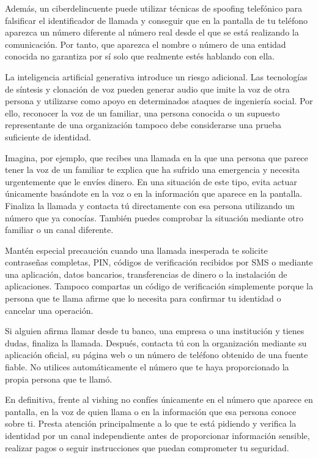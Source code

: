\documentclass[
  spanish,
  a4paper,
  openany]{book}
\begin{document}
Además, un ciberdelincuente puede utilizar técnicas de spoofing telefónico para falsificar el identificador de llamada y conseguir que en la pantalla de tu teléfono aparezca un número diferente al número real desde el que se está realizando la comunicación. Por tanto, que aparezca el nombre o número de una entidad conocida no garantiza por sí solo que realmente estés hablando con ella.

La inteligencia artificial generativa introduce un riesgo adicional. Las tecnologías de síntesis y clonación de voz pueden generar audio que imite la voz de otra persona y utilizarse como apoyo en determinados ataques de ingeniería social. Por ello, reconocer la voz de un familiar, una persona conocida o un supuesto representante de una organización tampoco debe considerarse una prueba suficiente de identidad.

Imagina, por ejemplo, que recibes una llamada en la que una persona que parece tener la voz de un familiar te explica que ha sufrido una emergencia y necesita urgentemente que le envíes dinero. En una situación de este tipo, evita actuar únicamente basándote en la voz o en la información que aparece en la pantalla. Finaliza la llamada y contacta tú directamente con esa persona utilizando un número que ya conocías. También puedes comprobar la situación mediante otro familiar o un canal diferente.

Mantén especial precaución cuando una llamada inesperada te solicite contraseñas completas, PIN, códigos de verificación recibidos por SMS o mediante una aplicación, datos bancarios, transferencias de dinero o la instalación de aplicaciones. Tampoco compartas un código de verificación simplemente porque la persona que te llama afirme que lo necesita para confirmar tu identidad o cancelar una operación.

Si alguien afirma llamar desde tu banco, una empresa o una institución y tienes dudas, finaliza la llamada. Después, contacta tú con la organización mediante su aplicación oficial, su página web o un número de teléfono obtenido de una fuente fiable. No utilices automáticamente el número que te haya proporcionado la propia persona que te llamó.

En definitiva, frente al vishing no confíes únicamente en el número que aparece en pantalla, en la voz de quien llama o en la información que esa persona conoce sobre ti. Presta atención principalmente a lo que te está pidiendo y verifica la identidad por un canal independiente antes de proporcionar información sensible, realizar pagos o seguir instrucciones que puedan comprometer tu seguridad.
\end{document}
